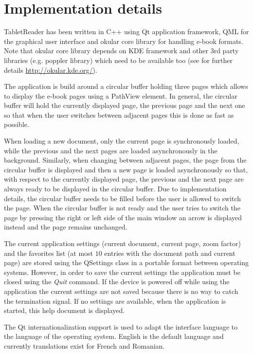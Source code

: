 \documentclass[journal,12pt]{IEEEtran}
\begin{document}
\section{Implementation details}
TabletReader has been written in C++ using Qt application framework, QML for the graphical user interface and okular core library for handling e-book formats. Note that okular core library depends on KDE framework and other 3rd party libraries (e.g. poppler library) which need to be available too (see for further details \url{http://okular.kde.org/}).

The application is build around a circular buffer holding three pages which allows to display the e-book pages using a PathView element. In general, the circular buffer will hold the currently displayed page, the previous page and the next one so that when the user switches between adjacent pages this is done as fast as possible. 

When loading a new document, only the current page is synchronously loaded, while the previous and the next pages are loaded asynchronously in the background. Similarly, when changing between adjacent pages, the page from the circular buffer is displayed and then a new page is loaded asynchronously so that, with respect to the currently displayed page, the previous and the next page are always ready to be displayed in the circular buffer. Due to implementation details, the circular buffer needs to be filled before the user is allowed to switch the page. When the circular buffer is not ready and the user tries to switch the page by pressing the right or left side of the main window an arrow is displayed instead and the page remains unchanged.

The current application settings (current document, current page, zoom factor) and the favorites list (at most $10$ entries with the document path and current page) are stored using the \textrm{QSettings} class in a portable format between operating systems. However, in order to save the current settings the application must be closed using the \textit{Quit} command. If the device is powered off while using the application the current settings are not saved because there is no way to catch the termination signal. If no settings are available, when the application is started, this help document is displayed.

The Qt internationalization support is used to adapt the interface language to the language of the operating system. English is the default language and currently translations exist for French and Romanian.
\end{document}

